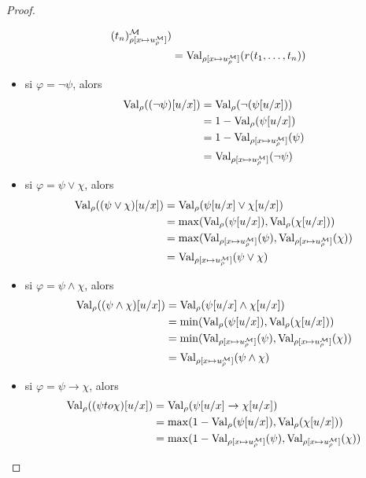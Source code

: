 \begin{proof}
\begin{itemize}
\begin{align*}
      (t_n)^\mathcal M_{\rho[x\mapsto u^\mathcal M_\rho]})\\
      &= \operatorname{Val}_{\rho[x\mapsto u^\mathcal M_\rho]}(r(t_1,\ldots,t_n))
    \end{align*}
  \item si $\varphi = \lnot \psi$, alors
    \begin{align*}
      \operatorname{Val}_\rho((\lnot \psi)[u/x]) &= \operatorname{Val}_\rho(\lnot (\psi[u/x]))\\
      &= 1 - \operatorname{Val}_\rho(\psi[u/x])\\
      &= 1 - \operatorname{Val}_{\rho[x\mapsto u^\mathcal M_\rho]}(\psi)\\
      &= \operatorname{Val}_{\rho[x\mapsto u^\mathcal M_\rho]}(\lnot\psi)\\
    \end{align*}
  \item si $\varphi = \psi \lor \chi$, alors
    \begin{align*}
      \operatorname{Val}_\rho((\psi \lor \chi)[u/x]) &= \operatorname{Val}_\rho(\psi[u/x] \lor \chi[u/x])\\
      &= \max (\operatorname{Val}_\rho(\psi[u/x]),\operatorname{Val}_\rho(\chi[u/x]))\\
      &= \max (\operatorname{Val}_{\rho[x\mapsto u^\mathcal M_\rho]}(\psi),
      \operatorname{Val}_{\rho[x \mapsto u^\mathcal M_\rho]}(\chi))\\
      &= \operatorname{Val}_{\rho[x\mapsto u^\mathcal M_\rho]}(\psi\lor \chi)
    \end{align*}
  \item si $\varphi = \psi \land \chi$, alors
    \begin{align*}
      \operatorname{Val}_\rho((\psi \land \chi)[u/x]) &= \operatorname{Val}_\rho(\psi[u/x] \land \chi[u/x])\\
      &= \min (\operatorname{Val}_\rho(\psi[u/x]),\operatorname{Val}_\rho(\chi[u/x]))\\
      &= \min (\operatorname{Val}_{\rho[x\mapsto u^\mathcal M_\rho]}(\psi),
      \operatorname{Val}_{\rho[x \mapsto u^\mathcal M_\rho]}(\chi))\\
      &= \operatorname{Val}_{\rho[x\mapsto u^\mathcal M_\rho]}(\psi\land \chi)
    \end{align*}
  \item si $\varphi = \psi \to \chi$, alors
    \begin{align*}
      \Val_\rho((\psi to \chi)[u/x]) &= \Val_\rho(\psi[u/x] \to \chi[u/x])\\
      &= \max (1 - \Val_\rho(\psi[u/x]),\Val_\rho(\chi[u/x]))\\
      &= \max (1 - \Val_{\rho[x\mapsto u^\mathcal M_\rho]}(\psi),
      \Val_{\rho[x \mapsto u^\mathcal M_\rho]}(\chi))\\

\end{align*}
\end{itemize}
\end{proof}
